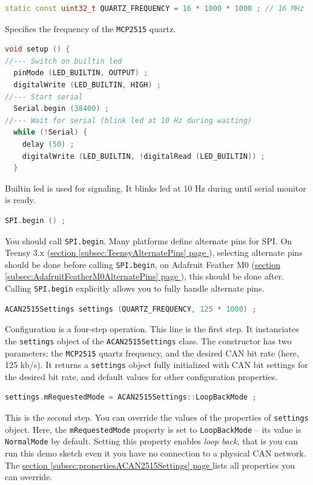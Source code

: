 \documentclass[10pt, a4paper, obeyspaces]{extarticle}
\newcommand\refSubsectionPage[1]{\hyperref[subsec:#1]{section \ref*{subsec:#1} page \pageref{subsec:#1}}}
\begin{document}
{ \small\begin{lstlisting}[language=c++]
static const uint32_t QUARTZ_FREQUENCY = 16 * 1000 * 1000 ; // 16 MHz
\end{lstlisting}}

Specifies the frequency of the \texttt{MCP2515} quartz.








{ \small\begin{lstlisting}[language=c++]
void setup () {
//--- Switch on builtin led
  pinMode (LED_BUILTIN, OUTPUT) ;
  digitalWrite (LED_BUILTIN, HIGH) ;
//--- Start serial
  Serial.begin (38400) ;
//--- Wait for serial (blink led at 10 Hz during waiting)
  while (!Serial) {
    delay (50) ;
    digitalWrite (LED_BUILTIN, !digitalRead (LED_BUILTIN)) ;
  }
\end{lstlisting}}
Builtin led is used for signaling. It blinks led at 10 Hz during until serial monitor is ready.



{ \small\begin{lstlisting}[language=c++]
  SPI.begin () ;
\end{lstlisting}}
You should call \texttt{SPI.begin}. Many platforms define alternate pins for SPI. On Teensy 3.x (\refSubsectionPage{TeensyAlternatePins}), selecting alternate pins should be done before calling \texttt{SPI.begin}, on Adafruit Feather M0 (\refSubsectionPage{AdafruitFeatherM0AlternatePins}), this should be done after. Calling \texttt{SPI.begin} explicitly allows you to fully handle alternate pins.

{ \small\begin{lstlisting}[language=c++]
  ACAN2515Settings settings (QUARTZ_FREQUENCY, 125 * 1000) ;
\end{lstlisting}}

Configuration is a four-step operation. This line is the first step. It instanciates the \texttt{settings} object of the \texttt{ACAN2515Settings} class. The constructor has two parameters: the \texttt{MCP2515} quartz frequency, and the desired CAN bit rate (here, 125 kb/s). It returns a \texttt{settings} object fully initialized with CAN bit settings for the desired bit rate, and default values for other configuration properties.






{ \small\begin{lstlisting}[language=c++]
  settings.mRequestedMode = ACAN2515Settings::LoopBackMode ;
\end{lstlisting}}
This is the second step. You can override the values of the properties of \texttt{settings} object. Here, the \texttt{mRequestedMode} property is set to \texttt{LoopBackMode} -- its value is \texttt{NormalMode} by default. Setting this property enables \emph{loop back}, that is you can run this demo sketch even it you have no connection to a physical CAN network. The \refSubsectionPage{propertiesACAN2515Settings} lists all properties you can override.
\end{document}
